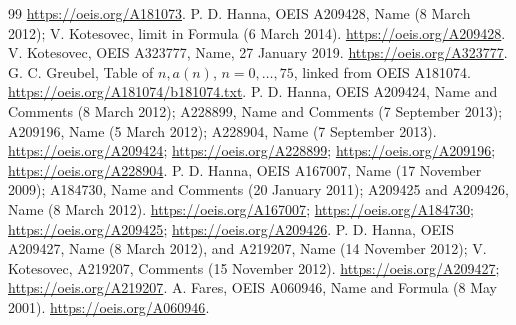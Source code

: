 \documentclass[11pt]{article}
\begin{document}
\begin{thebibliography}{99}
\url{https://oeis.org/A181073}.
 P. D. Hanna, OEIS A209428, Name (8 March 2012);
V. Kotesovec, limit in Formula (6 March 2014).
\url{https://oeis.org/A209428}.
 V. Kotesovec, OEIS A323777, Name, 27 January 2019.
\url{https://oeis.org/A323777}.
 G. C. Greubel, Table of \(n,a(n)\), \(n=0,\ldots,75\),
linked from OEIS A181074. \url{https://oeis.org/A181074/b181074.txt}.
 P. D. Hanna, OEIS A209424, Name and Comments
(8 March 2012); A228899, Name and Comments (7 September 2013);
A209196, Name (5 March 2012); A228904, Name (7 September 2013).
\url{https://oeis.org/A209424}; \url{https://oeis.org/A228899};
\url{https://oeis.org/A209196}; \url{https://oeis.org/A228904}.
 P. D. Hanna, OEIS A167007, Name (17 November 2009);
A184730, Name and Comments (20 January 2011);
A209425 and A209426, Name (8 March 2012).
\url{https://oeis.org/A167007}; \url{https://oeis.org/A184730};
\url{https://oeis.org/A209425}; \url{https://oeis.org/A209426}.
 P. D. Hanna, OEIS A209427, Name (8 March 2012),
and A219207, Name (14 November 2012); V. Kotesovec, A219207,
Comments (15 November 2012). \url{https://oeis.org/A209427};
\url{https://oeis.org/A219207}.
 A. Fares, OEIS A060946, Name and Formula (8 May 2001).
\url{https://oeis.org/A060946}.
\end{thebibliography}
\end{document}

